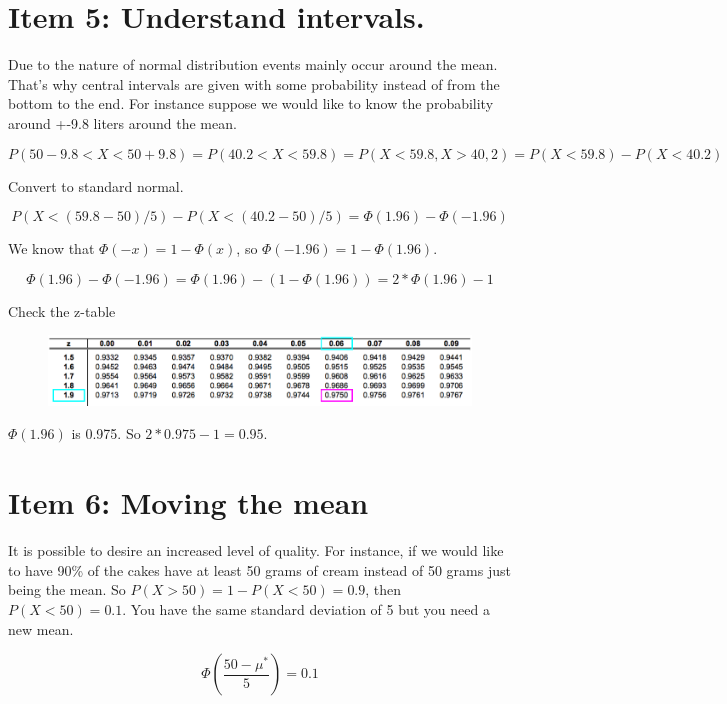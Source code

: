 \documentclass[]{book}
\theoremstyle{definition}
\theoremstyle{definition}
\theoremstyle{definition}
\theoremstyle{remark}
\begin{document}
\hypertarget{item-5-understand-intervals.}{%
\section{Item 5: Understand
intervals.}\label{item-5-understand-intervals.}}

Due to the nature of normal distribution events mainly occur around the
mean. That's why central intervals are given with some probability
instead of from the bottom to the end. For instance suppose we would
like to know the probability around +-9.8 liters around the mean.

\[P(50 - 9.8 < X < 50 + 9.8) = P(40.2 < X < 59.8) = P(X < 59.8,X > 40,2) = P(X < 59.8) - P(X < 40.2)\]

Convert to standard normal.

\[P(X < (59.8 - 50)/5) - P(X < (40.2 - 50)/5) = \Phi(1.96) - \Phi(-1.96)\]

We know that \(\Phi(-x)= 1 - \Phi(x)\), so
\(\Phi(-1.96) = 1 - \Phi(1.96)\).

\[\Phi(1.96) - \Phi(-1.96) = \Phi(1.96) - (1 - \Phi(1.96)) = 2*\Phi(1.96) - 1\]

Check the z-table

\begin{figure}
\begin{center}
\includegraphics[width=0.95\columnwidth]{img/ss3}
\end{center}
\end{figure}

\(\Phi(1.96)\) is 0.975. So \(2*0.975 - 1 = 0.95\).

\hypertarget{item-6-moving-the-mean}{%
\section{Item 6: Moving the mean}\label{item-6-moving-the-mean}}

It is possible to desire an increased level of quality. For instance, if
we would like to have 90\% of the cakes have at least 50 grams of cream
instead of 50 grams just being the mean. So
\(P(X > 50) = 1 - P(X < 50) = 0.9\), then \(P(X < 50) = 0.1\). You have
the same standard deviation of 5 but you need a new mean.

\[\Phi \left(\dfrac{50 - \mu^*}{5}\right) = 0.1\]
\end{document}
